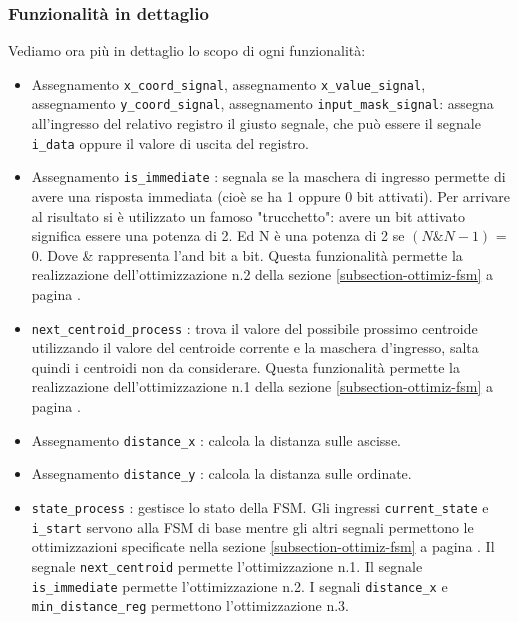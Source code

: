 \documentclass{article}
\begin{document}
\subsubsection{Funzionalità in dettaglio}
Vediamo ora più in dettaglio lo scopo di ogni funzionalità:
\begin{itemize}
    \item Assegnamento \verb^x_coord_signal^, assegnamento \verb^x_value_signal^, assegnamento \verb^y_coord_signal^, assegnamento \verb^input_mask_signal^: assegna all'ingresso del relativo registro il giusto segnale, che può essere il segnale \verb^i_data^ oppure il valore di uscita del registro.
    \item Assegnamento \verb^is_immediate^ : segnala se la maschera di ingresso permette di avere una risposta immediata (cioè se ha 1 oppure 0 bit attivati). Per arrivare al risultato si è utilizzato un famoso "trucchetto": avere un bit attivato significa essere una potenza di 2. Ed N è una potenza di 2 se \((N \& N-1)\) = 0. Dove \& rappresenta l'and bit a bit. Questa funzionalità permette la realizzazione dell'ottimizzazione n.2 della sezione \ref{subsection-ottimiz-fsm} a pagina \pageref{subsection-ottimiz-fsm}.
    \item \verb^next_centroid_process^ : trova il valore del possibile prossimo centroide utilizzando il valore del centroide corrente e la maschera d'ingresso, salta quindi i centroidi non da considerare. Questa funzionalità permette la realizzazione dell'ottimizzazione n.1 della sezione \ref{subsection-ottimiz-fsm} a pagina \pageref{subsection-ottimiz-fsm}.
    \item Assegnamento \verb^distance_x^ : calcola la distanza sulle ascisse.
    \item Assegnamento \verb^distance_y^ : calcola la distanza sulle ordinate.
    \item \verb^state_process^ : gestisce lo stato della FSM. Gli ingressi \verb^current_state^ e \verb^i_start^ servono alla FSM di base mentre gli altri segnali permettono le ottimizzazioni specificate nella sezione \ref{subsection-ottimiz-fsm} a pagina \pageref{subsection-ottimiz-fsm}. Il segnale \verb^next_centroid^ permette l'ottimizzazione n.1. Il segnale \verb^is_immediate^ permette l'ottimizzazione n.2. I segnali \verb^distance_x^ e \verb^min_distance_reg^ permettono l'ottimizzazione n.3.

\end{itemize}
\end{document}
